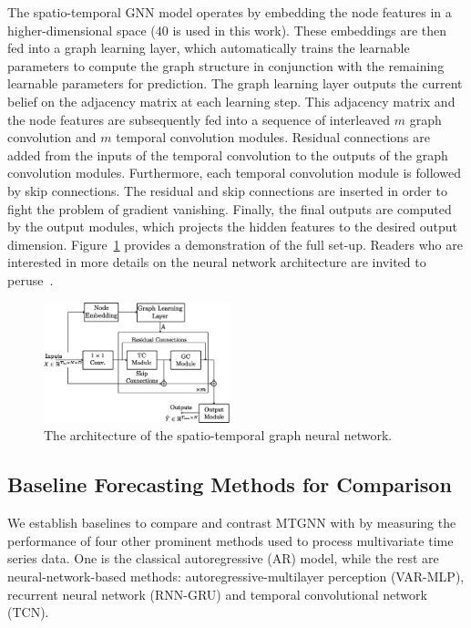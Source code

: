 The spatio-temporal GNN model operates by embedding the node features in a higher-dimensional space
($40$ is used in this work). These embeddings are then fed into a graph learning layer, which automatically
trains the learnable parameters to compute the graph structure in conjunction with the remaining learnable
parameters for prediction. The graph learning layer outputs the current belief on the adjacency matrix at 
each learning step. This adjacency matrix and the node features are subsequently fed into a sequence of 
interleaved $m$ graph convolution and $m$ temporal convolution modules. Residual connections are added from
the inputs of the temporal convolution to the outputs of the graph convolution modules. Furthermore, 
each temporal convolution module is followed by skip connections. The residual and skip connections are 
inserted in order to fight the problem of gradient vanishing. Finally, the final outputs are computed 
by the output modules, which projects the hidden features to the desired output dimension. 
Figure~\ref{fig:gnn_architecture} provides a demonstration of the full set-up. Readers who are interested 
in more details on the neural network architecture are invited to peruse~\citep{wu2020connecting}.

%
\begin{figure}[tbh]
  \centering
  \includegraphics[width=0.48\textwidth]{./figures/gnn_architecture_v1.eps}
  \caption{The architecture of the spatio-temporal graph neural network.} 
  \label{fig:gnn_architecture}
\end{figure}
%

\subsection{Baseline Forecasting Methods for Comparison}
\label{ssec:multi_ts}
%
We establish baselines to compare and contrast MTGNN with by measuring the performance of four other 
prominent methods used to process multivariate time series data. One is the classical autoregressive (AR) model, 
while the rest are neural-network-based methods: autoregressive-multilayer perception (VAR-MLP), 
recurrent neural network (RNN-GRU) and temporal convolutional network (TCN).


